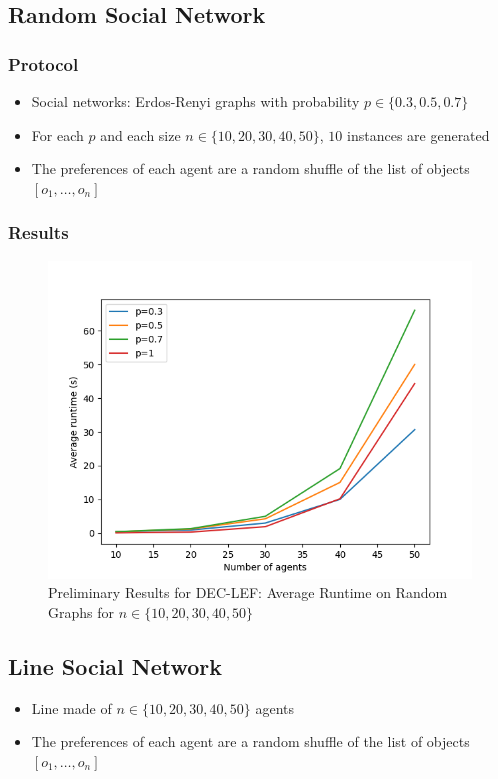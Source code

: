 \documentclass{article}
\begin{document}
\subsection{Random Social Network}
\subsubsection{Protocol}
\begin{itemize}
	\item Social networks: Erdos-Renyi graphs with probability $p \in \{0.3, 0.5, 0.7\}$
	\item For each $p$ and each size $n \in \{10,20,30,40,50\}$, $10$ instances are generated
	\item The preferences of each agent are a random shuffle of the list of objects $[o_1,\dots,o_n]$
\end{itemize}

\subsubsection{Results}
\begin{figure}[htb]
\centering
\includegraphics[width=0.5\linewidth]{prelim-random-results.png}
\caption{Preliminary Results for DEC-LEF: Average Runtime on Random Graphs for $n \in \{10,20,30,40,50\}$}
\end{figure}

\subsection{Line Social Network}
\begin{itemize}
	\item Line made of $n \in \{10, 20, 30, 40, 50\}$ agents
	\item The preferences of each agent are a random shuffle of the list of objects $[o_1,\dots,o_n]$
\end{itemize}
\end{document}
